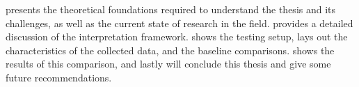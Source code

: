  presents the theoretical foundations required to understand the thesis and its challenges, as well as the current state of research in the field.
 provides a detailed discussion of the interpretation framework.
 shows the testing setup, lays out the characteristics of the collected data, and the baseline comparisons.
 shows the results of this comparison, and lastly  will conclude this thesis and give some future recommendations.



